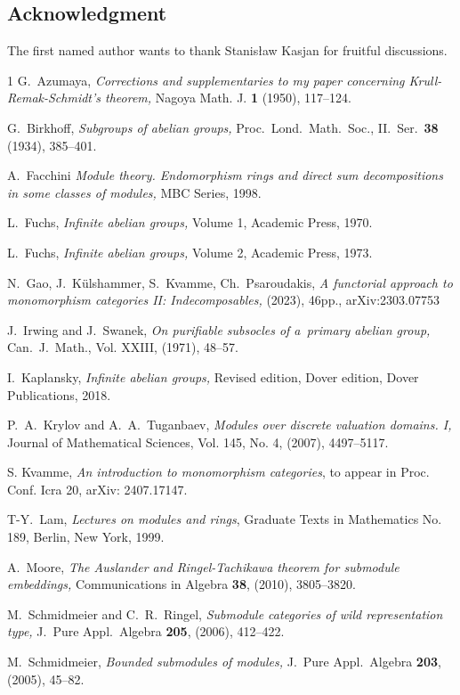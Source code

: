 \documentclass[twoside,leqno,12pt]{amsart}
\theoremstyle{definition}
\theoremstyle{remark}
\numberwithin{equation}{section}
\begin{document}
\subsection*{Acknowledgment} The first named author wants to thank Stanis\l aw Kasjan for fruitful discussions.


\begin{thebibliography}{1}
G.\ Azumaya, {}
{\it Corrections and supplementaries to my paper concerning Krull-Remak-Schmidt’s theorem,}
Nagoya Math. J. {\bf 1} (1950), 117--124.

  G.\ Birkhoff, {\it Subgroups of abelian groups,}
  Proc.\ Lond.\ Math.\ Soc., II.\ Ser.\ {\bf 38} (1934), 385--401.

A.\ Facchini {\it Module theory. Endomorphism rings and direct sum decompositions in some classes of modules,} MBC Series, 1998.


L.\ Fuchs, {\it Infinite abelian groups,} Volume 1, Academic Press, 1970.

L.\ Fuchs, {\it Infinite abelian groups,} Volume 2, Academic Press, 1973.

 N.\ Gao, J.\ K\"ulshammer, S.\ Kvamme, Ch.\ Psaroudakis,
  {\it A functorial approach to monomorphism categories II: Indecomposables,} (2023), 46pp., arXiv:2303.07753

J.\ Irwing and J.\ Swanek, {\it On purifiable subsocles of a~primary abelian group,} Can.\ J.\ Math., Vol. XXIII, (1971), 48--57.

I.\ Kaplansky, {\it Infinite abelian groups,}
Revised edition,  Dover edition, Dover Publications, 2018.

  P.\ A.\ Krylov and A.\ A.\ Tuganbaev, {\it Modules over discrete valuation domains. I,}
  Journal of Mathematical Sciences, Vol. 145, No. 4, (2007), 4497--5117.

S. Kvamme, {\it An introduction to monomorphism categories}, to appear in Proc. Conf. Icra 20, arXiv: 2407.17147.

T-Y.\, Lam, {\it Lectures on modules and rings}, Graduate Texts in Mathematics No. 189, Berlin, New York, 1999.

  A.\ Moore, {\it The Auslander and Ringel-Tachikawa theorem for submodule embeddings,}
  Communications in Algebra {\bf 38}, (2010), 3805--3820.


 M.\ Schmidmeier and C.\ R.\ Ringel,
  {\it  Submodule categories of wild representation type,} J.\ Pure Appl.\ Algebra {\bf 205}, (2006), 412--422.

  M.\ Schmidmeier, {\it Bounded submodules of modules,} J.\ Pure Appl.\ Algebra {\bf 203}, (2005), 45--82.

\end{thebibliography}

\end{document}
